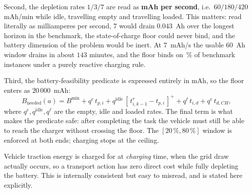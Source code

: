 \documentclass[preprint, 3p, review, 12pt]{elsarticle}
\theoremstyle{definition}
\begin{document}
Second, the depletion rates $1/3/7$ are read as \textbf{mAh per second}, i.e.\ $60/180/420$
mAh/min while idle, travelling empty and travelling loaded. This matters: read literally as
milliamperes per second, $7$ would drain $0.043$~Ah over the longest horizon in the
benchmark, the state-of-charge floor could never bind, and the battery dimension of the
problem would be inert. At $7$~mAh/s the usable $60$~Ah window drains in about $143$
minutes, and the floor binds on \,\% of benchmark instances
under a purely reactive charging rule.

Third, the battery-feasibility predicate is expressed entirely in mAh, so the floor enters
as $20\,000$~mAh:
\begin{equation}
B_{\mathrm{needed}}(a) = B^{\min}
 + q^{e}\,t_{p,i} + q^{\mathrm{idle}}\,[\,t^{r}_{i,k-1}-t_{p,i}\,]^{+}
 + q^{\ell}\,t_{i,d} + q^{e}\,t_{d,CH},
\label{eq:bneeded}
\end{equation}
where $q^{e}, q^{\mathrm{idle}}, q^{\ell}$ are the empty, idle and loaded rates. The final
term is what makes the predicate safe: after completing the task the vehicle must still be
able to reach the charger without crossing the floor. The $[20\,\%,80\,\%]$ window is
enforced at both ends; charging stops at the ceiling.

Vehicle traction energy is charged for at \emph{charging} time, when the grid draw actually
occurs, so a transport action has zero direct cost while fully depleting the battery. This is
internally consistent but easy to misread, and is stated here explicitly.
\end{document}
